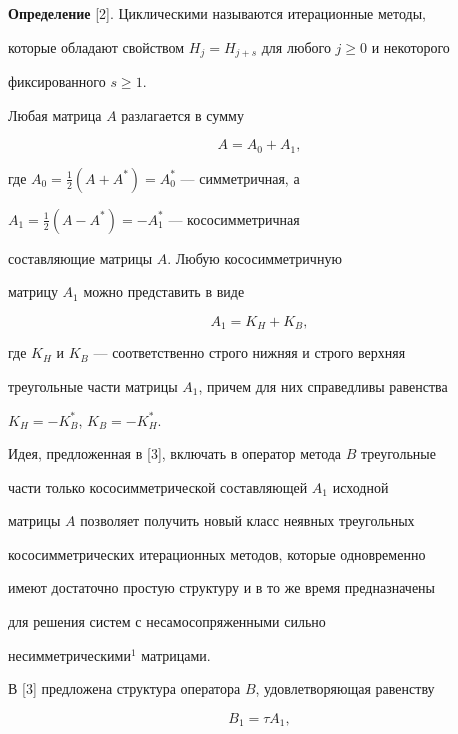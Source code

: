  


{\bf Определение} [2]. Циклическими называются итерационные методы, 


которые обладают свойством $H_j=H_{j+s}$ для любого $j\ge0$ и некоторого 


фиксированного $s\ge1$. 


\medskip 


 


Любая матрица $A$ разлагается в сумму 


$$ 


A=A_0+A_1,


$$ 


где $A_0=\frac{1}{2}(A+A^*)=A^*_0$ --- симметричная, а 


$A_1=\frac{1}{2}(A-A^*)=-A^*_1$ --- кососимметричная 


составляющие матрицы $A$. Любую кососимметричную  


матрицу $A_1$ можно представить в виде 


$$ 


A_1=K_H+K_B, 


$$ 


где $K_H$ и $K_B$ --- соответственно строго нижняя и строго верхняя 


треугольные части матрицы $A_1$, причем для них справедливы равенства  


$K_H=-K^*_B$, $K_B=-K^*_H$. 


 


Идея, предложенная в [3], включать в оператор метода $B$ треугольные  


части только кососимметрической составляющей $A_1$ исходной 


матрицы $A$ позволяет получить новый класс неявных треугольных  


кососимметрических итерационных методов, которые одновременно  


имеют достаточно простую структуру и в то же время предназначены  


для решения систем с несамосопряженными сильно 


несимметрическими$^1$ матрицами.  


 


В [3] предложена структура оператора $B$, удовлетворяющая равенству 


\begin{equation} 


B_1=\tau A_1, 


\end{equation} 


